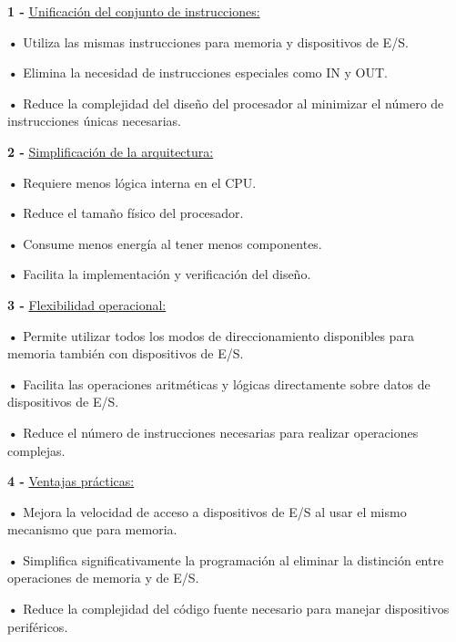 \documentclass{article}
\begin{document}
\quad

\textbf{1 -  } {\underline{Unificación del conjunto de instrucciones: }}

\quad

\textbf{    •} { Utiliza las mismas instrucciones para memoria y dispositivos de E/S.}

\textbf{    •} { Elimina la necesidad de instrucciones especiales como IN y OUT.}

\textbf{    •} { Reduce la complejidad del diseño del procesador al minimizar el número de instrucciones únicas necesarias.}

\quad

\textbf{2 -  } {\underline{Simplificación de la arquitectura: }}

\quad

\textbf{    •} { Requiere menos lógica interna en el CPU.}

\textbf{    •} { Reduce el tamaño físico del procesador.}

\textbf{    •} { Consume menos energía al tener menos componentes.}

\textbf{    •} { Facilita la implementación y verificación del diseño.}

\quad

\textbf{3 -  } {\underline{Flexibilidad operacional: }}

\quad

\textbf{    •} { Permite utilizar todos los modos de direccionamiento disponibles para memoria también con dispositivos de  E/S.}

\textbf{    •} { Facilita las operaciones aritméticas y lógicas directamente sobre datos de dispositivos de E/S.}

\textbf{    •} { Reduce el número de instrucciones necesarias para realizar operaciones complejas.}

\quad

\textbf{4 -  } {\underline{Ventajas prácticas: }}

\quad

\textbf{    •} { Mejora la velocidad de acceso a dispositivos de E/S al usar el mismo mecanismo que para memoria.}

\textbf{    •} { Simplifica significativamente la programación al eliminar la distinción entre operaciones de memoria y de E/S.}

\textbf{    •} { Reduce la complejidad del código fuente necesario para manejar dispositivos periféricos.}

\quad
\end{document}
